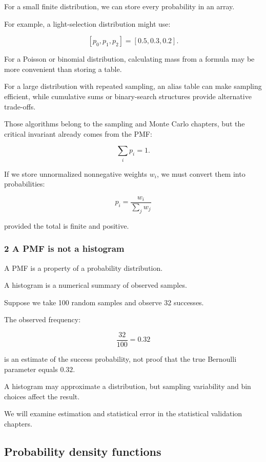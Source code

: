 For a small finite distribution, we can store every probability in an array.

For example, a light-selection distribution might use:

\[
 [p_0,p_1,p_2]=[0.5,0.3,0.2].
\]

For a Poisson or binomial distribution, calculating mass from a formula may be more convenient than storing a table.

For a large distribution with repeated sampling, an alias table can make sampling efficient, while cumulative sums or binary-search structures provide alternative trade-offs.

Those algorithms belong to the sampling and Monte Carlo chapters, but the critical invariant already comes from the PMF:

\[
 \sum_ip_i=1.
\]

If we store unnormalized nonnegative weights \(w_i\), we must convert them into probabilities:

\[
 \boxed{ p_i=\frac{w_i}{\sum_jw_j} }
\]

provided the total is finite and positive.

\subsubsection{2 A PMF is not a histogram}\label{02-foundations-ii-ch023-a-pmf-is-not-a-histogram}

A PMF is a property of a probability distribution.

A histogram is a numerical summary of observed samples.

Suppose we take 100 random samples and observe 32 successes.

The observed frequency:

\[
 \frac{32}{100}=0.32
\]

is an estimate of the success probability, not proof that the true Bernoulli parameter equals \(0.32\).

A histogram may approximate a distribution, but sampling variability and bin choices affect the result.

We will examine estimation and statistical error in the statistical validation chapters.

\subsection{Probability density functions}\label{02-foundations-ii-ch023-probability-density-functions}

